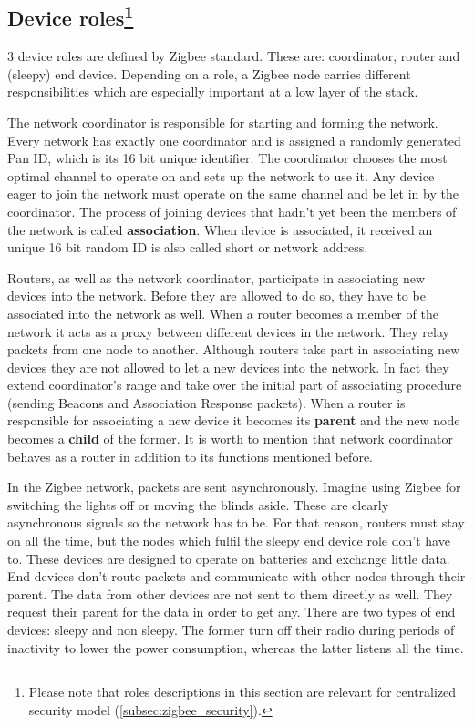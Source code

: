 \subsection[Device roles]{Device roles\footnote{Please note that roles descriptions in this section are relevant for
centralized security model (\ref{subsec:zigbee_security}).}}

3 device roles are defined by Zigbee standard. These are: coordinator,
router and (sleepy) end device. Depending on a role, a Zigbee node carries different 
responsibilities which are especially important at a low layer of the stack.

The network coordinator is responsible for starting and forming the network. Every network has
exactly one coordinator and is assigned a randomly generated Pan ID, which is its 16 bit unique
identifier. The coordinator chooses the most optimal channel to operate on and sets up
the network to use it.
Any device eager to join the network must operate on the same channel and be let in by the coordinator. The process of joining devices that hadn't yet been the members of the 
network is called \textbf{association}.
When device is associated, it received an unique 16 bit random ID is also called short or network address.

Routers, as well as the network coordinator, participate in associating new devices into the 
network. Before they are allowed to do so, they have to be associated into the network as 
well. When a router becomes a member of the network it acts as a proxy between different devices in the network. They relay packets from one node to another. Although routers take part in associating new devices they are not allowed to
let a new devices into the network. In fact they extend coordinator's range and take over the initial
part of associating procedure (sending Beacons and Association Response packets)\cite{ZigbeeSpecification}. When a router is responsible for associating a new device
it becomes its \textbf{parent} and the new node becomes a \textbf{child} of the former. It is 
worth to mention that network coordinator behaves as a router in addition to its functions 
mentioned before.

In the Zigbee network, packets are sent asynchronously. Imagine using Zigbee for switching
the lights off or moving the blinds aside. These are clearly asynchronous signals so the 
network has to be. For that reason, routers must stay on all the time, but the nodes which
fulfil the sleepy end device role don't have to. These devices
are designed to operate on batteries and exchange little data. End devices don't route packets
and communicate with other nodes through their parent. The data from other devices are 
not sent to them directly as well. They request their parent for the data in order to get 
any. There are two types of end devices: sleepy and non sleepy. The former turn off their 
radio during periods of inactivity to lower the power consumption\cite{ZigbeeSleepyEndDevice}, whereas the
latter listens all the time.

